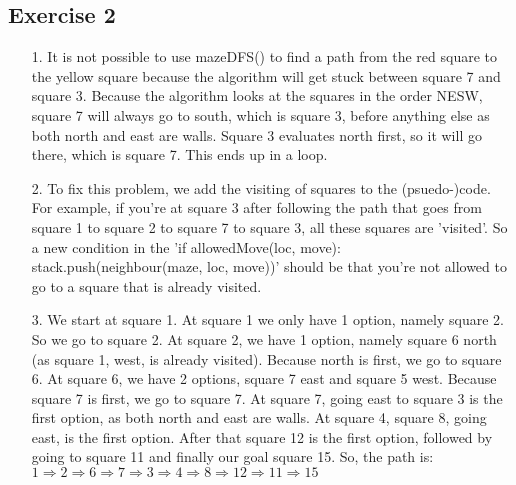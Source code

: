 \documentclass{article}
\begin{document}
	\subsection*{Exercise 2}
	\begin{enumerate}
	
	\item[1.] 
	It is not possible to use mazeDFS() to find a path from the red square to the yellow square because the algorithm will get stuck between square 7 and square 3. Because the algorithm looks at the squares in the order NESW, square 7 will always go to south, which is square 3, before anything else as both north and east are walls. Square 3 evaluates north first, so it will go there, which is square 7. This ends up in a loop.
	
	\item[2.]
	To fix this problem, we add the visiting of squares to the (psuedo-)code. For example, if you're at square 3 after following the path that goes from square 1 to square 2 to square 7 to square 3, all these squares are 'visited'. So a new condition in the 'if allowedMove(loc, move):
	stack.push(neighbour(maze, loc, move))' should be that you're not allowed to go to a square that is already visited.
	
	\item[3.] We start at square 1. At square 1 we only have 1 option, namely square 2. So we go to square 2. At square 2, we have 1 option, namely square 6 north (as square 1, west, is already visited). Because north is first, we go to square 6. At square 6, we have 2 options, square 7 east and square 5 west. Because square 7 is first, we go to square 7. At square 7, going east to square 3 is the first option, as both north and east are walls. At square 4, square 8, going east, is the first option. After that square 12 is the first option, followed by going to square 11 and finally our goal square 15. So, the path is:\\
	$1\Rightarrow2\Rightarrow6\Rightarrow7\Rightarrow3\Rightarrow4\Rightarrow8\Rightarrow12\Rightarrow11\Rightarrow15$ 
	

\end{enumerate}
\end{document}
